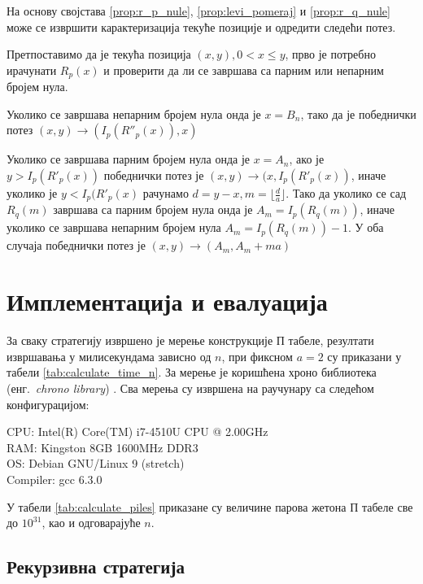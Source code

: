 \documentclass[a4paper]{article}
\begin{document}
На основу својстава \ref{prop:r_p_nule}, \ref{prop:levi_pomeraj} и \ref{prop:r_q_nule} може се извршити карактеризација текуће позиције и одредити следећи потез.

Претпоставимо да је текућа позиција $ (x, y), 0 < x \le y $, прво је потребно ирачунати $ R_{p}(x) $ и проверити да ли се завршава са парним или непарним бројем нула.

Уколико се завршава непарним бројем нула онда је $ x = B_{n} $, тако да је победнички потез $ (x, y) \rightarrow (I_{p}(R''_{p}(x)), x) $

Уколико се завршава парним бројем нула онда је $ x = A_{n} $, ако је $ y > I_{p}(R'_{p}(x)) $ победнички потез је $ (x, y) \rightarrow (x, I_{p}(R'_{p}(x)) $, иначе уколико је $ y < I_{p}(R'_{p}(x) $ рачунамо $ d = y - x, m = \lfloor \frac{d}{a} \rfloor $. Тако да уколико се сад $ R_{q}(m) $ завршава са парним бројем нула онда је $ A_{m} = I_{p}(R_{q}(m)) $, иначе уколико се завршава непарним бројем нула $ A_{m} = I_{p}(R_{q}(m)) - 1 $. У оба случаја победнички потез је $ (x, y) \rightarrow (A_{m}, A_{m} + ma) $

\section{Имплементација и евалуација}
\label{implementacija_evaluacija}

За сваку стратегију извршено је мерење конструкције П табеле, резултати извршавања у милисекундама зависно од $ n $, при фиксном $ a = 2 $ су приказани у табели \ref{tab:calculate_time_n}. 
За мерење је коришћена хроно библиотека (енг.{~\em chrono library}) \cite{chrono_library}. Сва мерења су извршена на раучунару са следећом конфигурацијом:
\begin{flushleft}
	CPU: Intel(R) Core(TM) i7-4510U CPU @ 2.00GHz\\
	RAM: Kingston 8GB 1600MHz DDR3\\
	OS: Debian GNU/Linux 9 (stretch)\\
	Compiler: gcc 6.3.0\\
\end{flushleft}

У табели \ref{tab:calculate_piles} приказане су величине парова жетона П табеле све до $ 10^{31} $, као и одговарајуће $ n $.

\subsection{Рекурзивна стратегија}
\end{document}

